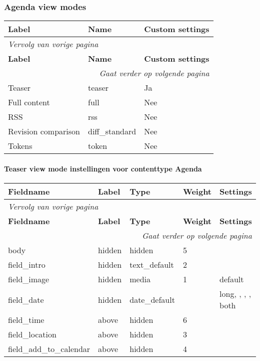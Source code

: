\subsubsection{Agenda view modes}
  \begin{longtable}{| p{5.00cm}|p{5.00cm}|p{5.00cm}|}
  \hline
  \rowcolor{tableheader}
  \textbf{Label} & \textbf{Name} & \textbf{Custom settings}  \tabularnewline
  \hline
\endfirsthead
\multicolumn{3}{l}{\textit{Vervolg van vorige pagina}} \\
\hline
\rowcolor{tableheader}
  \textbf{Label} & \textbf{Name} & \textbf{Custom settings}  \tabularnewline
  \hline
\hline
\endhead
\multicolumn{3}{r}{\textit{Gaat verder op volgende pagina}} \\
\endfoot
\hline
\endlastfoot
  Teaser & teaser & Ja  \tabularnewline
  \hline
  Full content & full & Nee  \tabularnewline
  \hline
  RSS & rss & Nee  \tabularnewline
  \hline
  Revision comparison & diff\_standard & Nee  \tabularnewline
  \hline
  Tokens & token & Nee  \tabularnewline
  \hline
  \end{longtable}

\paragraph{Teaser view mode instellingen voor contenttype Agenda }

  \begin{longtable}{| p{3.00cm}|p{3.00cm}|p{3.00cm}|p{3.00cm}|p{3.00cm}|}
  \hline
  \rowcolor{tableheader}
  \textbf{Fieldname} & \textbf{Label} & \textbf{Type} & \textbf{Weight} & \textbf{Settings}  \tabularnewline
  \hline
\endfirsthead
\multicolumn{5}{l}{\textit{Vervolg van vorige pagina}} \\
\hline
\rowcolor{tableheader}
  \textbf{Fieldname} & \textbf{Label} & \textbf{Type} & \textbf{Weight} & \textbf{Settings}  \tabularnewline
  \hline
\hline
\endhead
\multicolumn{5}{r}{\textit{Gaat verder op volgende pagina}} \\
\endfoot
\hline
\endlastfoot
  body & hidden & hidden & 5 &    \tabularnewline
  \hline
  field\_intro & hidden & text\_default & 2 &    \tabularnewline
  \hline
  field\_image & hidden & media & 1 & default  \tabularnewline
  \hline
  field\_date & hidden & date\_default &   & long, , , , both  \tabularnewline
  \hline
  field\_time & above & hidden & 6 &    \tabularnewline
  \hline
  field\_location & above & hidden & 3 &    \tabularnewline
  \hline
  field\_add\_to\_calendar & above & hidden & 4 &    \tabularnewline
  \hline
  \end{longtable}

